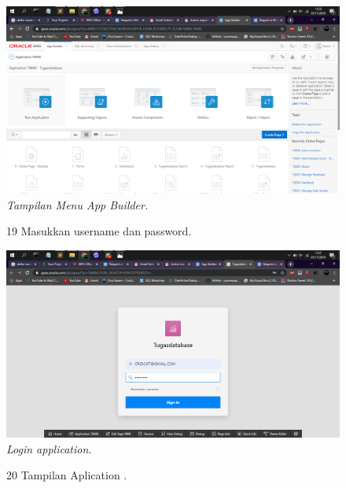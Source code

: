 \begin{enumerate}
\begin{figure}
    \begin{center}
\includegraphics[scale=0.2]{figures/17.png}
    \caption{\textit{Tampilan Menu App Builder.}}
        \end{center}
\label{gambar}
\end{figure}


\begin{figure}
\item[19]Masukkan username dan password.

    \begin{center}
\includegraphics[scale=0.2]{figures/18.png}
    \caption{\textit{Login application.}}
        \end{center}
\label{gambar}
\end{figure}

\begin{figure}
\item[20]Tampilan Aplication .


\end{figure}
\end{enumerate}
